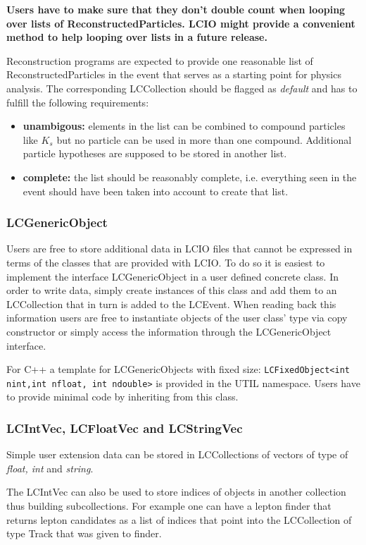 \documentclass[twoside]{article}
\begin{document}
{\bf Users have to make sure that they don't double count when looping over lists of ReconstructedParticles. 
LCIO might provide a convenient method to help looping over lists in a future release.}

Reconstruction programs are expected to provide one reasonable list of ReconstructedParticles in the event
that serves as a starting point for physics analysis. The corresponding LCCollection should be flagged 
as {\em default} and has to fulfill the following requirements:
\begin{itemize}
\item{{\bf unambigous:} elements in the list can be combined to compound particles like $K_s$ but no particle
can be used in more than one compound. Additional particle hypotheses are supposed to  be stored in another 
list.}
\item{{\bf complete:} the list should be reasonably complete, i.e. everything seen in the event should have 
been taken into account to create that list.}
\end{itemize}


\subsubsection{LCGenericObject}
Users are free to store additional data in LCIO files that cannot be expressed in terms of the classes that 
are provided with LCIO. To do so it is easiest to implement the interface LCGenericObject in a user defined
concrete class. In order to write data, simply create instances of this class and add them to an LCCollection
that in turn is added to the LCEvent. When reading back this information users are free to instantiate 
objects of the user class' type via copy constructor or simply access the information through the
LCGenericObject interface.

For C++ a template for LCGenericObjects with fixed size: \verb$LCFixedObject<int nint,int nfloat, int ndouble>$ 
is provided in the UTIL namespace. Users have to provide minimal code by inheriting from this class.

\subsubsection{LCIntVec, LCFloatVec and LCStringVec}
Simple user extension data can be stored in LCCollections of vectors of type of {\em float, int} and {\em string}. 

The LCIntVec can also be used to store indices of objects in another collection thus building
subcollections. For example one can have a lepton finder that returns lepton candidates as a list of 
indices that point into the LCCollection of type Track that was given to finder.
\end{document}

